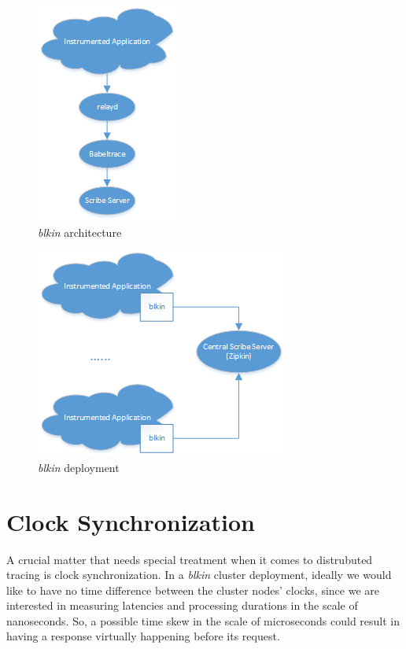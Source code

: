 \documentclass[a4paper,10pt,twocolumn]{article}
\begin{document}
\begin{figure}[h!]
  \centering
  \includegraphics[scale=0.75]{images/specific.png}
  \caption{\emph{blkin} architecture}
  \label{fig:specific}
\end{figure}

\begin{figure}[h!]
  \centering
  \includegraphics[scale=0.75]{images/generic.png}
  \caption{\emph{blkin} deployment}
  \label{fig:generic}
\end{figure}

\section{Clock Synchronization}

A crucial matter that needs special treatment when it comes to distrubuted
tracing is clock synchronization. In a \emph{blkin} cluster deployment, ideally
we would like to have no time difference between the cluster nodes' clocks,
since we are interested in measuring latencies and processing durations in the
scale of nanoseconds. So, a possible time skew in the scale of microseconds
could result in having a response virtually happening before its request.
\end{document}
